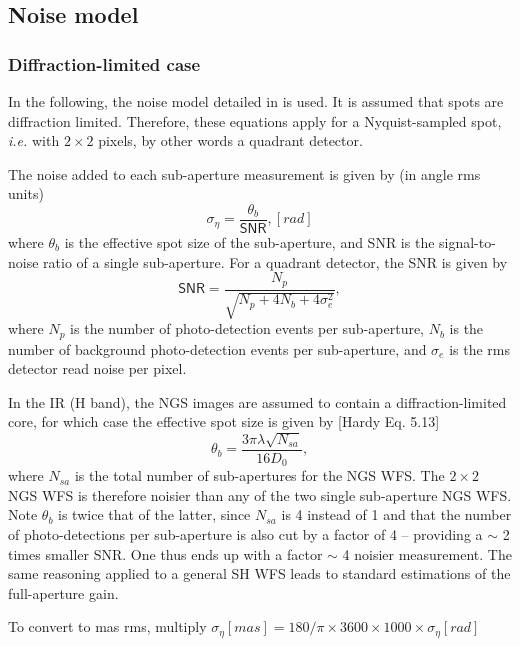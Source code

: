 \documentclass[a4paper,12pt]{article}
\newcommand{\0}{\mathsf{0}} %
\begin{document}
\subsection{Noise model}

\subsubsection{Diffraction-limited case}
In the following, the noise model detailed in \cite{clare06} is
used. It is assumed that spots are diffraction limited. Therefore,
these equations apply for a Nyquist-sampled spot, \textit{i.e.} with
$2\times2$ pixels, by other words a quadrant detector.


The noise added to each sub-aperture measurement is given by (in angle
rms units)
\begin{equation}\label{eq:etab}
  \sigma_\eta = \frac{\theta_b}{\textsf{SNR}},   [rad]
\end{equation}
where $\theta_b$ is the effective spot size of the sub-aperture, and SNR is the signal-to-noise ratio of a
single sub-aperture. For a quadrant detector, the SNR
is given by
\begin{equation}\label{eq:SNR}
  \textsf{SNR}= \frac{N_p}{\sqrt{N_p+4N_b+4\sigma_e^2}},
\end{equation}
where $N_p$ is the number of photo-detection events per
sub-aperture, $N_b$ is the number of background photo-detection
events per sub-aperture, and $\sigma_e$ is the rms
detector read noise per pixel.

In the IR (H band), the NGS images are assumed to
contain a diffraction-limited core, for which case the effective
spot size is given by [Hardy Eq. 5.13]
\begin{equation}\label{eq:thetab}
  \theta_b = \frac{3\pi\lambda\sqrt{N_{sa}}}{16D_0},
\end{equation}
where $N_{sa}$ is the total number of sub-apertures for the
NGS WFS. The $2\times2$ NGS WFS is therefore noisier than any of the two
single sub-aperture NGS WFS. Note $\theta_b$ is twice that of the latter,
since $N_{sa}$ is 4 instead of 1 and that the number of
photo-detections per sub-aperture is also cut by a factor of 4 --
providing a $\sim$ 2 times smaller SNR. One thus ends up with a factor
$\sim$ 4
noisier measurement. The same reasoning applied to a general SH WFS
leads to standard estimations of the full-aperture gain. 

To convert to mas rms, multiply $\sigma_\eta [mas] = 
180/\pi \times 3600 \times 1000 \times \sigma_\eta [rad]$ 
\end{document}
